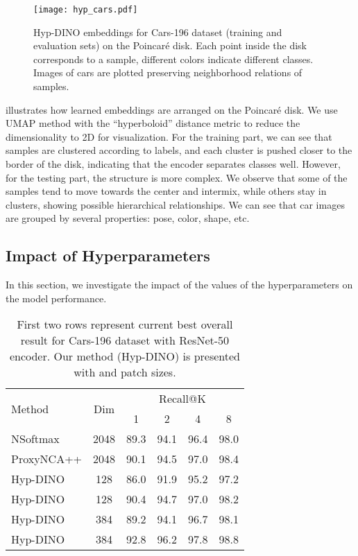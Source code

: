 \documentclass[10pt,twocolumn,letterpaper]{article}
\begin{document}
\begin{figure}
\begin{center}
\texttt{[image: hyp\_cars.pdf]}
\vspace{-2mm}
\caption{Hyp-DINO embeddings for Cars-196 dataset (training and evaluation sets) on the Poincar\'e disk. Each point inside the disk corresponds to a sample, different colors indicate different classes. Images of cars are plotted preserving neighborhood relations of samples.}
\label{fig:cars}
\end{center}
\end{figure}

 illustrates how learned embeddings are arranged on the Poincar\'e disk. We use UMAP \cite{UMAP} method with the ``hyperboloid'' distance metric to reduce the dimensionality to 2D for visualization. For the training part, we can see that samples are clustered according to labels, and each cluster is pushed closer to the border of the disk, indicating that the encoder separates classes well. However, for the testing part, the structure is more complex. We observe that some of the samples tend to move towards the center and intermix, while others stay in clusters, showing possible hierarchical relationships. We can see that car images are grouped by several properties: pose, color, shape, etc.

\subsection{Impact of Hyperparameters}
\label{sec:ablations}

In this section, we investigate the impact of the values of the hyperparameters on the model performance.

\setlength{\tabcolsep}{.5em}
\begin{table}
  \centering
  \begin{tabular}{l|c|c c c c}
    \toprule
    \multirow{2}{*}{Method} &
    \multirow{2}{*}{Dim} &
    \multicolumn{4}{c}{Recall@K}\\
    & & 1 & 2 & 4 & 8\\
    \midrule
    NSoftmax \cite{NSoftmax} & 2048 & 89.3 & 94.1 & 96.4 & 98.0 \\
    ProxyNCA++ \cite{PNCAPP} & 2048 & 90.1 & 94.5 & 97.0 & 98.4 \\
    \midrule
    Hyp-DINO  & 128 & 86.0 & 91.9 & 95.2 & 97.2 \\
    Hyp-DINO  & 128 & 90.4 & 94.7 & 97.0 & 98.2 \\
    Hyp-DINO  & 384 & 89.2 & 94.1 & 96.7 & 98.1 \\
    Hyp-DINO  & 384 & 92.8 & 96.2 & 97.8 & 98.8 \\
    \bottomrule
  \end{tabular}
  \caption{First two rows represent current best overall result for Cars-196 dataset with ResNet-50 encoder. Our method \mbox{(Hyp-DINO)} is presented with  and  patch sizes.}
  \label{tab:exp_patch8}
  \vspace{-0.5cm}
\end{table}
\end{document}
